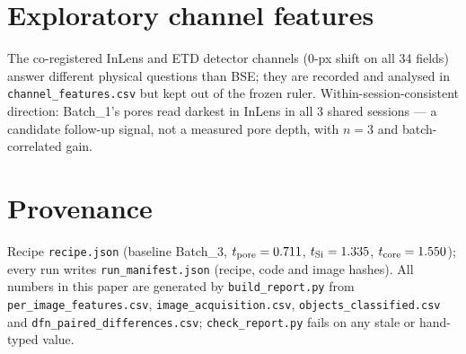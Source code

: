 \documentclass[10pt,a4paper]{article}
\begin{document}
\section{Exploratory channel features}
\label{app:channels}

The co-registered InLens and ETD detector channels (0-px shift on all 34
fields) answer different physical questions than BSE; they are recorded
and analysed in \texttt{channel\_features.csv} but kept out of the frozen
ruler. Within-session-consistent direction: Batch\_1's pores read darkest
in InLens in all 3 shared sessions --- a candidate follow-up signal, not
a measured pore depth, with $n=3$ and batch-correlated gain.

\section{Provenance}
\label{app:prov}

Recipe \texttt{recipe.json} (baseline Batch\_3, $t_{\rm pore}=0.711$,
$t_{\rm Si}=1.335$, $t_{\rm core}=1.550$); every run writes
\texttt{run\_manifest.json} (recipe, code and image hashes). All numbers
in this paper are generated by \texttt{build\_report.py} from
\texttt{per\_image\_features.csv}, \texttt{image\_acquisition.csv},
\texttt{objects\_classified.csv} and \texttt{dfn\_paired\_differences.csv};
\texttt{check\_report.py} fails on any stale or hand-typed value.
\end{document}
